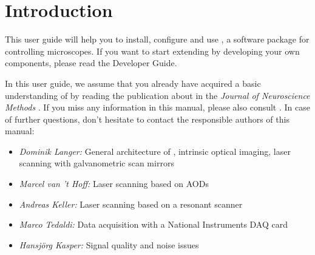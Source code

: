 \chapter{Introduction}

This user guide will help you to install, configure and use \HS, a software package for controlling microscopes. If you want to start extending \HS by developing your own components, please read the Developer Guide. 

In this user guide, we assume that you already have acquired a basic understanding of \HS by reading the publication about \HS in the \textit{Journal of Neuroscience Methods} \cite{Langer2013}. If you miss any information in this manual, please also consult \cite{Langer2011}. In case of further questions, don't hesitate to contact the responsible authors of this manual:

\begin{itemize}
	\item \textit{Dominik Langer:} General architecture of \HS, intrinsic optical imaging, laser scanning with galvanometric scan mirrors
	\item \textit{Marcel van 't Hoff:} Laser scanning based on \acp{AOD}
	\item \textit{Andreas Keller:} Laser scanning based on a resonant scanner
	\item \textit{Marco Tedaldi:} Data acquisition with a  National Instruments DAQ card
	\item \textit{Hansjörg Kasper:} Signal quality and noise issues
\end{itemize}














